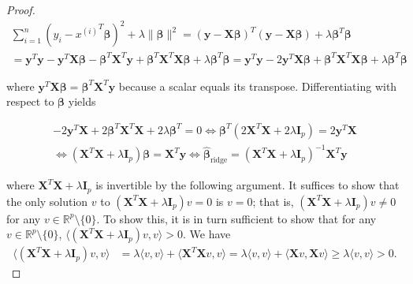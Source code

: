 \begin{proof}

\begin{multline*}
 \sum_{i=1}^{n}\left(y_{i}-{x^{(i)}}^T\boldsymbol{\beta} \right )^{2}+\lambda\lVert \boldsymbol{\beta}\rVert ^{2} = (\boldsymbol{y} - \boldsymbol{X}\boldsymbol{\beta})^T(\boldsymbol{y}-\boldsymbol{X}\boldsymbol{\beta}) + \lambda \boldsymbol{\beta}^T\boldsymbol{\beta}
\\ = \boldsymbol{y}^T\boldsymbol{y} - \boldsymbol{y}^T\boldsymbol{X}\boldsymbol{\beta} - \boldsymbol{\beta}^T\boldsymbol{X}^T\boldsymbol{y}+\boldsymbol{\beta}^T\boldsymbol{X}^T\boldsymbol{X}\boldsymbol{\beta} + \lambda \boldsymbol{\beta}^T\boldsymbol{\beta} = \boldsymbol{y}^T\boldsymbol{y} - 2\boldsymbol{y}^T\boldsymbol{X}\boldsymbol{\beta} +\boldsymbol{\beta}^T\boldsymbol{X}^T\boldsymbol{X}\boldsymbol{\beta} + \lambda \boldsymbol{\beta}^T\boldsymbol{\beta}
\end{multline*}

where \(\boldsymbol{y}^T\boldsymbol{X}\boldsymbol{\beta} =\boldsymbol{\beta}^T\boldsymbol{X}^T\boldsymbol{y}\) because a scalar equals its transpose. Differentiating with respect to \(\boldsymbol{\beta}\) yields

\begin{multline*}
-2\boldsymbol{y}^T\boldsymbol{X} + 2\boldsymbol{\beta}^T \boldsymbol{X}^T\boldsymbol{X} + 2\lambda \boldsymbol{\beta}^T = 0 \iff \boldsymbol{\beta}^T(2\boldsymbol{X}^T\boldsymbol{X} + 2\lambda \boldsymbol{I}_p) = 2 \boldsymbol{y}^T\boldsymbol{X}
\\ \iff (\boldsymbol{X}^T\boldsymbol{X} + \lambda \boldsymbol{I}_p) \boldsymbol{\beta}=  \boldsymbol{X}^T\boldsymbol{y} \iff \hat{\boldsymbol{\beta}}_{\text{ridge}} = (\boldsymbol{X}^T\boldsymbol{X} + \lambda \boldsymbol{I}_p)^{-1}\boldsymbol{X}^T\boldsymbol{y}
 \end{multline*}
 
 where \(\boldsymbol{X}^T\boldsymbol{X} + \lambda \boldsymbol{I}_p\) is invertible by the following argument. It suffices to show that the only solution \(v\) to \(\left( \boldsymbol{X}^T\boldsymbol{X} + \lambda \boldsymbol{I}_p\right)  v = 0\) is \(v = 0\); that is, \(\left( \boldsymbol{X}^T\boldsymbol{X} + \lambda \boldsymbol{I}_p\right)  v  \neq 0\) for any \(v \in \mathbb{R}^p \setminus \{0\}\). To show this, it is in turn sufficient to show that for any \(v \in \mathbb{R}^p \setminus \{0\}\), \( \langle \left( \boldsymbol{X}^T\boldsymbol{X} + \lambda \boldsymbol{I}_p\right) v, v \rangle > 0\). We have
 \begin{align*}
 \langle \left( \boldsymbol{X}^T\boldsymbol{X} + \lambda \boldsymbol{I}_p\right) v, v \rangle & = \lambda \langle v, v \rangle + \langle  \boldsymbol{X}^T\boldsymbol{X}  v , v \rangle = \lambda \langle v, v \rangle + \langle  \boldsymbol{X}  v , \boldsymbol{X} v \rangle \geq   \lambda \langle v, v \rangle > 0.
 \end{align*}
 

\end{proof}

